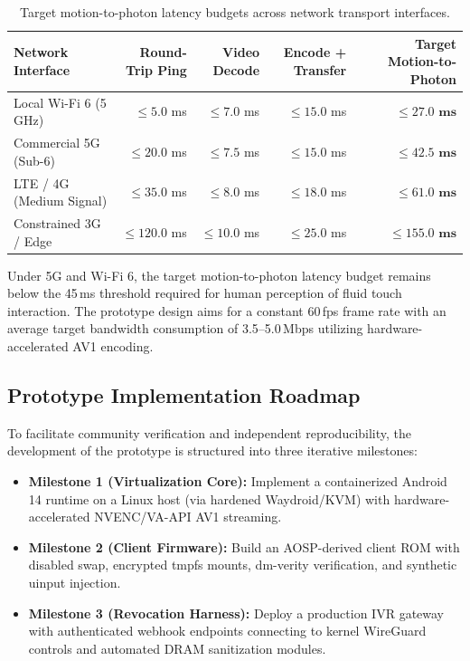 \begin{table}[h!]
\centering
\small
\begin{tabular}{lrrrr}
\toprule
\textbf{Network Interface} & \textbf{Round-Trip Ping} & \textbf{Video Decode} & \textbf{Encode + Transfer} & \textbf{Target Motion-to-Photon} \\
\midrule
Local Wi-Fi 6 (5 GHz) & $\le 5.0$ ms & $\le 7.0$ ms & $\le 15.0$ ms & $\mathbf{\le 27.0\text{ ms}}$ \\
Commercial 5G (Sub-6) & $\le 20.0$ ms & $\le 7.5$ ms & $\le 15.0$ ms & $\mathbf{\le 42.5\text{ ms}}$ \\
LTE / 4G (Medium Signal) & $\le 35.0$ ms & $\le 8.0$ ms & $\le 18.0$ ms & $\mathbf{\le 61.0\text{ ms}}$ \\
Constrained 3G / Edge & $\le 120.0$ ms & $\le 10.0$ ms & $\le 25.0$ ms & $\mathbf{\le 155.0\text{ ms}}$ \\
\bottomrule
\end{tabular}
\caption{Target motion-to-photon latency budgets across network transport interfaces.}
\label{tab:latency_benchmarks}
\end{table}

Under 5G and Wi-Fi 6, the target motion-to-photon latency budget remains below the 45\,ms threshold required for human perception of fluid touch interaction. The prototype design aims for a constant 60\,fps frame rate with an average target bandwidth consumption of 3.5--5.0\,Mbps utilizing hardware-accelerated AV1 encoding.

\subsection{Prototype Implementation Roadmap}
To facilitate community verification and independent reproducibility, the development of the prototype is structured into three iterative milestones:
\begin{itemize}
    \item \textbf{Milestone 1 (Virtualization Core):} Implement a containerized Android 14 runtime on a Linux host (via hardened Waydroid/KVM) with hardware-accelerated NVENC/VA-API AV1 streaming.
    \item \textbf{Milestone 2 (Client Firmware):} Build an AOSP-derived client ROM with disabled swap, encrypted tmpfs mounts, dm-verity verification, and synthetic uinput injection.
    \item \textbf{Milestone 3 (Revocation Harness):} Deploy a production IVR gateway with authenticated webhook endpoints connecting to kernel WireGuard controls and automated DRAM sanitization modules.
\end{itemize}
